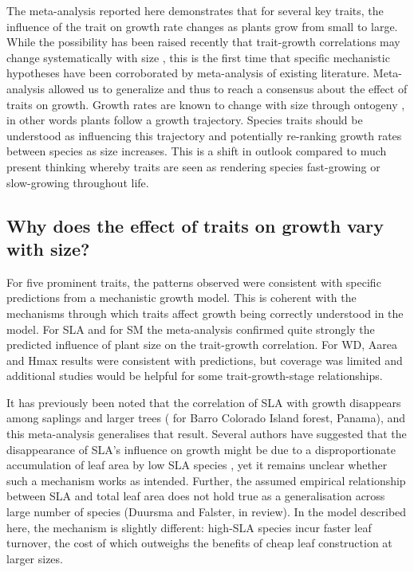 \documentclass[a4paper,11pt]{article}
\begin{document}
The meta-analysis reported here demonstrates that for several key traits, the influence of the trait on growth rate changes as plants grow from small to large. While the possibility has been raised recently that trait-growth correlations may change systematically with size \citep{Falster:2011ii, Ruger:2012jv, Iida:2014ep, Iida:2014hq}, this is the first time that specific mechanistic hypotheses have been corroborated by meta-analysis of existing literature. Meta-analysis allowed us to generalize and thus to reach a consensus about the effect of traits on growth. Growth rates are known to change with size through ontogeny \citep{Condit:1993hd, Clark:1999ed, Herault:2011dd}, in other words plants follow a growth trajectory. Species traits should be understood as influencing this trajectory and potentially re-ranking growth rates between species as size increases. This is a shift in outlook compared to much present thinking whereby traits are seen as rendering species fast-growing or slow-growing throughout life.

\subsection*{Why does the effect of traits on growth vary with size?}

For five prominent traits, the patterns observed were consistent with specific predictions from a mechanistic growth model. This is coherent with the mechanisms through which traits affect growth being correctly understood in the model. For SLA and for SM the meta-analysis confirmed quite strongly the predicted influence of plant size on the trait-growth correlation. For WD, Aarea and Hmax results were consistent with predictions, but coverage was limited and additional studies would be helpful for some trait-growth-stage relationships.

It has previously been noted that the correlation of SLA with growth disappears among saplings and larger trees (\citealt{Wright:2010tp} for Barro Colorado Island forest, Panama), and this meta-analysis generalises that result. Several authors have suggested that the disappearance of SLA's influence on growth might be due to a disproportionate accumulation of leaf area by low SLA species \citep{Reich:1992wm,Poorter:2008iu,Wright:2010tp}, yet it remains unclear whether such a mechanism works as intended. Further, the assumed empirical relationship between SLA and total leaf area does not hold true as a generalisation across large number of species (Duursma and Falster, in review). In the model described here, the mechanism is slightly different: high-SLA species incur faster leaf turnover, the cost of which outweighs the benefits of cheap leaf construction at larger sizes.
\end{document}

